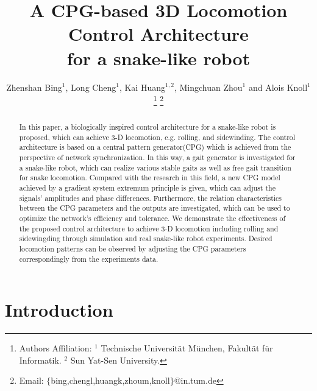 \documentclass[letterpaper, 10 pt, conference]{ieeeconf}
\begin{document}
\title{\LARGE \bf
A CPG-based 3D Locomotion Control Architecture\\
for a snake-like robot
}

\author{Zhenshan Bing$^1$, Long Cheng$^1$, Kai Huang$^{1,2}$, Mingchuan Zhou$^1$ and Alois Knoll$^1$
\thanks{Authors Affiliation: $^1$ Technische Universit\"at M\"unchen, Fakult\"at f\"ur Informatik. $^2$ Sun Yat-Sen University.}
\thanks{Email: $\{$bing,chengl,huangk,zhoum,knoll$\}$@in.tum.de}%
}

\maketitle


\begin{abstract}
In this paper, a biologically inspired control architecture for a snake-like robot is proposed, which can achieve 3-D locomotion, e.g. rolling, and sidewinding.
The control architecture is based on a central pattern generator(CPG) which is achieved from the perspective of network synchronization.
In this way, a gait generator is investigated for a snake-like robot, which can realize various stable gaits as well as free gait transition for snake locomotion.
Compared with the research in this field, a new CPG model achieved by a gradient system extremum principle is given, which can adjust the signals' amplitudes and phase differences.
Furthermore, the relation characteristics between the CPG parameters and the outputs are investigated, which can be used to optimize the network's efficiency and tolerance.
We demonstrate the effectiveness of the proposed control architecture to achieve 3-D locomotion including rolling and sidewingding through simulation and real snake-like robot experiments. Desired locomotion patterns can be observed by adjusting the CPG parameters correspondingly from the experiments data.
\end{abstract}


\section{Introduction}
\end{document}
